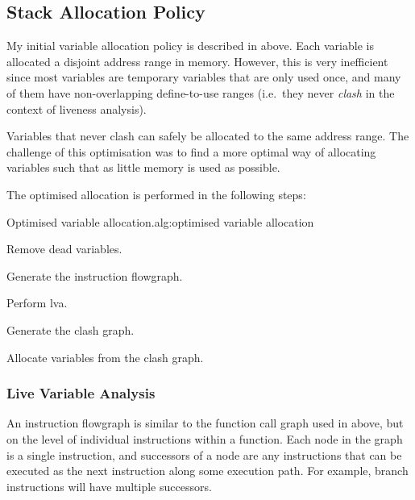\documentclass[00-main.tex]{subfiles}
\begin{document}
\subsection{Stack Allocation Policy}\label{sec:impl:optimised stack allocation}

My initial variable allocation policy is described in  above.
Each variable is allocated a disjoint address range in memory.
However, this is very inefficient since most variables are temporary variables that are only used once, and many of them have non-overlapping define-to-use ranges (i.e.\ they never \emph{clash} in the context of liveness analysis).

Variables that never clash can safely be allocated to the same address range.
The challenge of this optimisation was to find a more optimal way of allocating variables such that as little memory is used as possible.

The optimised allocation is performed in the following steps:

\begin{Algorithm}{Optimised variable allocation.}{alg:optimised variable allocation}
\begin{EnumerateAlgorithm}
\item Remove dead variables.
\item Generate the instruction flowgraph.
\item Perform \acrlong{lva}.
\item Generate the clash graph.
\item Allocate variables from the clash graph.
\end{EnumerateAlgorithm}
\end{Algorithm}

\subsubsection{Live Variable Analysis}

\newcommand{\lvadef}{\ensuremath{\mathit{def}}}
\newcommand{\lvaref}{\ensuremath{\mathit{ref}}}

An instruction flowgraph is similar to the function call graph used in  above, but on the level of individual instructions within a function.
Each node in the graph is a single instruction, and successors of a node are any instructions that can be executed as the next instruction along some execution path.
For example, branch instructions will have multiple successors.
\end{document}
